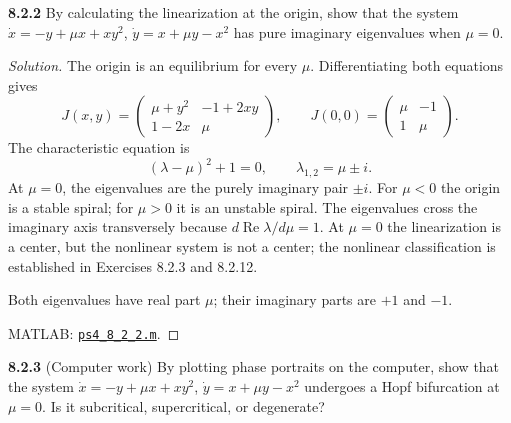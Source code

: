 \documentclass[10pt]{amsart}
\newenvironment{solution}
{\begin{proof}[Solution]}
{\end{proof}}
\begin{document}
\begin{onehalfspace}
        \noindent\textbf{8.2.2}
        By calculating the linearization at the origin, show that the system $\dot{x}=-y+\mu x+xy^2$, $\dot{y}=x+\mu y-x^2$ has pure imaginary eigenvalues when $\mu=0$.

        \begin{solution}

The origin is an equilibrium for every $\mu$. Differentiating both equations gives
\[
 J(x,y)=\begin{pmatrix}\mu+y^2&-1+2xy\\1-2x&\mu\end{pmatrix},
 \qquad J(0,0)=\begin{pmatrix}\mu&-1\\1&\mu\end{pmatrix}.
\]
The characteristic equation is
\[
 (\lambda-\mu)^2+1=0,
 \qquad \lambda_{1,2}=\mu\pm i.
\]
At $\mu=0$, the eigenvalues are the purely imaginary pair $\pm i$. For $\mu<0$ the origin is a stable spiral; for $\mu>0$ it is an unstable spiral. The eigenvalues cross the imaginary axis transversely because $d\operatorname{Re}\lambda/d\mu=1$. At $\mu=0$ the linearization is a center, but the nonlinear system is not a center; the nonlinear classification is established in Exercises 8.2.3 and 8.2.12.

\begin{center}

\par\medskip
\end{center}
Both eigenvalues have real part $\mu$; their imaginary parts are $+1$ and $-1$.

\medskip
\noindent MATLAB: \href{https://github.com/chtompki/MathFall2026/blob/main/DynamicalSystems/ProblemSet4/ps4_8_2_2.m}{\nolinkurl{ps4_8_2_2.m}}.

        \end{solution}

        \noindent\textbf{8.2.3}
        (Computer work) By plotting phase portraits on the computer, show that the system $\dot{x}=-y+\mu x+xy^2$, $\dot{y}=x+\mu y-x^2$ undergoes a Hopf bifurcation at $\mu=0$. Is it subcritical, supercritical, or degenerate?


\end{onehalfspace}
\end{document}
